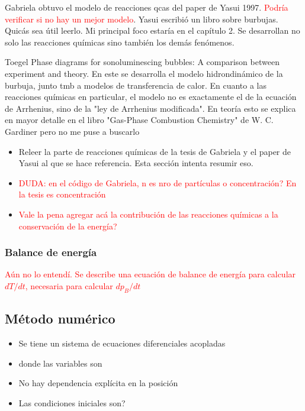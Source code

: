 \documentclass[aps,prb,twocolumn,superscriptaddress,floatfix,longbibliography,10pt]{revtex4-2}
\newif\ifptitle
\newif\ifpnumber
\newcounter{para}
\newcommand\ptitle[1]{\par\refstepcounter{para}
{\ifpnumber{\noindent\textcolor{lightgray}{\textbf{\thepara}}\indent}\fi}
{\ifptitle{\textbf{[{#1}]}}\fi}}
\begin{document}
Gabriela obtuvo el modelo de reacciones qcas del paper de Yasui 1997. \textcolor{red}{Podría verificar si no hay un mejor modelo}.
Yasui escribió un libro sobre burbujas. Quicás sea útil leerlo. Mi principal foco estaría en el capítulo 2. Se desarrollan no solo las reacciones químicas sino también los demás fenómenos.

Toegel Phase diagrams for sonoluminescing bubbles: A comparison between experiment and theory. En este se desarrolla el modelo hidrondinámico de la burbuja, junto tmb a modelos de transferencia de calor. En cuanto a las reacciones químicas en particular, el modelo no es exactamente el de la ecuación de Arrhenius, sino de la "ley de Arrhenius modificada". En teoría esto se explica en mayor detalle en el libro "Gas-Phase Combustion Chemistry" de W. C. Gardiner pero no me puse a buscarlo



\begin{itemize}
  \item Releer la parte de reacciones químicas de la tesis de Gabriela y el paper de Yasui al que se hace referencia. Esta sección intenta resumir eso.
  \item \textcolor{red}{DUDA: en el código de Gabriela, n es nro de partículas o concentración? En la tesis es concentración}
  \item \textcolor{red}{Vale la pena agregar acá la contribución de las reacciones químicas a la conservación de la energía?}
\end{itemize}


\subsubsection{Balance de energía}
\textcolor{red}{Aún no lo entendí. Se describe una ecuación de balance de energía para calcular $dT/dt$, necesaria para calcular $dp_B/dt$}



\subsection{Método numérico}

\ptitle{Este es un problema de valores iniciales}
\begin{itemize}
  \item Se tiene un sistema de ecuaciones diferenciales acopladas
  \item donde las variables son 
  \item No hay dependencia explícita en la posición
  \item Las condiciones iniciales son?
\end{itemize}
\end{document}
